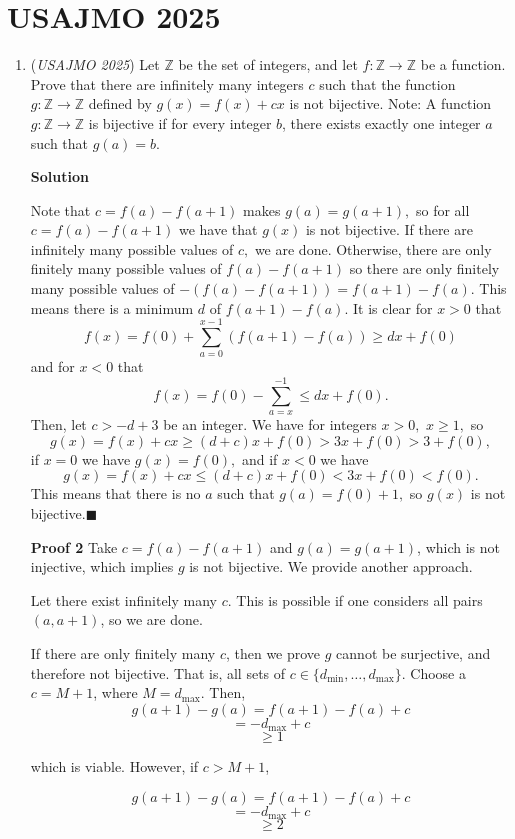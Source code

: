 \section{USAJMO 2025}
        \begin{enumerate}
        	\item (\textit{USAJMO 2025}) Let $\mathbb Z$ be the set of integers, and let $f\colon \mathbb Z \to \mathbb Z$ be a function. Prove that there are infinitely many integers $c$ such that the function $g\colon \mathbb Z \to \mathbb Z$ defined by $g(x) = f(x) + cx$ is not bijective.
Note: A function $g\colon \mathbb Z \to \mathbb Z$ is bijective if for every integer $b$, there exists exactly one integer $a$ such that $g(a) = b$.


 



\textbf{Solution}

Note that $c=f(a)-f(a+1)$ makes $g(a)=g(a+1),$ so for all $c=f(a)-f(a+1)$ we have that $g(x)$ is not bijective. If there are infinitely many possible values of $c,$ we are done. Otherwise, there are only finitely many possible values of $f(a)-f(a+1)$ so there are only finitely many possible values of $-(f(a)-f(a+1))=f(a+1)-f(a).$ This means there is a minimum $d$ of $f(a+1)-f(a).$ It is clear for $x>0$ that
 \[f(x)=f(0)+\sum_{a=0}^{x-1}(f(a+1)-f(a))\ge dx+f(0)\]and for $x<0$ that
 \[f(x)=f(0)-\sum_{a=x}^{-1}\le dx+f(0).\]Then, let $c>-d+3$ be an integer. We have for integers $x>0,$ $x\ge 1,$ so
 \[g(x)=f(x)+cx\ge (d+c)x+f(0)>3x+f(0)>3+f(0),\]if $x=0$ we have $g(x)=f(0),$ and if $x<0$ we have
 \[g(x)=f(x)+cx\le (d+c)x+f(0)<3x+f(0)<f(0).\]This means that there is no $a$ such that $g(a)=f(0)+1,$ so $g(x)$ is not bijective.$\blacksquare$

 \textbf{Proof 2} Take $c = f(a) - f(a+1)$ and $g(a) = g(a+1)$, which is not injective, which implies $g$ is not bijective. We provide another approach.

 Let there exist infinitely many $c$. This is possible if one considers all pairs $(a,a+1)$, so we are done.

 If there are only finitely many $c$, then we prove $g$ cannot be surjective, and therefore not bijective. That is, all sets of $c \in \{d_{\min}, \dots, d_{\max} \}$. Choose a $c = M+1$, where $M = d_{\max}$. Then,
 \[g(a+1) - g(a) = f(a+1)-f(a) + c\]
 \[=-d_{\max} + c\]
 \[\geq 1\]

 which is viable. However, if $c > M+1$,

 
 \[g(a+1) - g(a) = f(a+1)-f(a) + c\]
 \[=-d_{\max} + c\]
 \[\geq 2\]


\end{enumerate}
